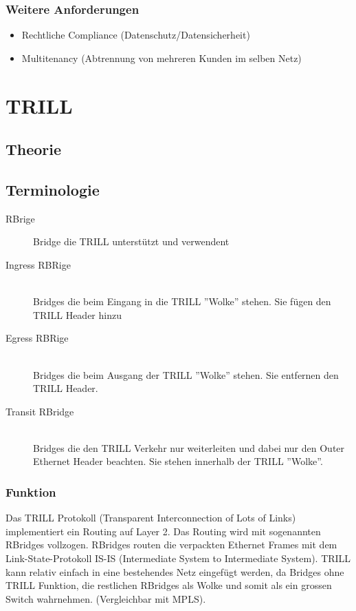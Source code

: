 \subsubsection{Weitere Anforderungen }
\begin{itemize}
	\item Rechtliche Compliance (Datenschutz/Datensicherheit)
	\item Multitenancy (Abtrennung von mehreren Kunden im selben Netz)
\end{itemize}


\section{TRILL}
\subsection{Theorie}
\subsection{Terminologie}
\begin{description}
	\item[RBrige] Bridge die TRILL unterstützt und verwendent
	\item[Ingress RBRige] \hfill \\
	Bridges die beim Eingang in die TRILL ''Wolke'' stehen. Sie fügen den TRILL Header hinzu
	\item[Egress RBRige] \hfill \\
	Bridges die beim Ausgang der TRILL ''Wolke'' stehen. Sie entfernen den TRILL Header.
	\item[Transit RBridge]  \hfill \\
	Bridges die den TRILL Verkehr nur weiterleiten und dabei nur den Outer Ethernet Header beachten. Sie stehen innerhalb der TRILL ''Wolke''.
\end{description}

\subsubsection{Funktion} %
Das TRILL Protokoll  (Transparent Interconnection of Lots of Links) implementiert ein Routing auf Layer 2. Das Routing wird mit sogenannten RBridges vollzogen. RBridges routen die verpackten Ethernet Frames mit dem Link-State-Protokoll IS-IS (Intermediate System to Intermediate System). TRILL kann relativ einfach in eine bestehendes Netz eingefügt werden, da Bridges ohne TRILL Funktion, die restlichen RBridges als Wolke und somit als ein grossen Switch wahrnehmen. (Vergleichbar mit MPLS). \\ 

